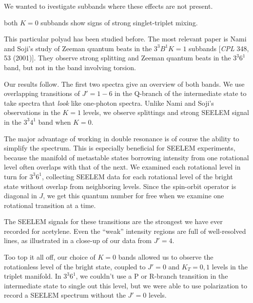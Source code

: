 \documentclass[12pt]{mitthesis}
\begin{document}
We wanted to ivestigate subbands where these effects are not present.

both $K=0$ subbands show signs of strong singlet-triplet mixing.

This particular polyad has been studied before. The most relevant
paper is Nami and Soji's study of Zeeman quantum beats in the $3^3 B^1
K=1$ subbands [\emph{CPL} 348, 53 (2001)].  They observe strong
splitting and Zeeman quantum beats in the $3^3 6^1$ band, but not in
the band involving torsion.

Our results follow.  The first two spectra give an overview of both
bands.  We use overlapping transitions of $J'=1-6$ in the Q-branch of
the intermediate state to take spectra that \emph{look} like
one-photon spectra.  Unlike Nami and Soji's observations in the $K=1$
levels, we observe splittings and strong SEELEM signal in the $3^3
4^1$ band when $K=0$.

The major advantage of working in double resonance is of course the
ability to simplify the spectrum.  This is especially beneficial for
SEELEM experiments, because the manifold of metastable states
borrowing intensity from one rotational level often overlaps with that
of the next.  We examined each rotational level in turn for $3^3 6^1$,
collecting SEELEM data for each rotational level of the bright state
without overlap from neighboring levels.  Since the spin-orbit
operator is diagonal in $J$, we get this quantum number for free when
we examine one rotational transition at a time.

The SEELEM signals for these transitions are the strongest we have
ever recorded for acetylene.  Even the ``weak'' intensity regions are
full of well-resolved lines, as illustrated in a close-up of our data
from $J'=4$.

Too top it all off, our choice of $K=0$ bands allowed us to observe
the rotationless level of the bright state, coupled to $J'=0$ and
$K_T=0,1$ levels in the triplet manifold.  In $3^3 6^1$, we couldn't use
a P or R-branch transition in the intermediate state to single out
this level, but we were able to use polarization to record a SEELEM
spectrum without the $J'=0$ levels.



\end{document}
